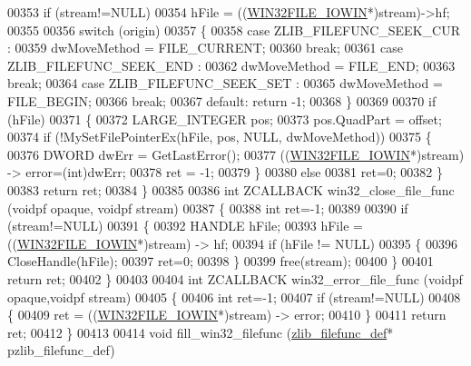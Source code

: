 \begin{DoxyCode}
00353     \textcolor{keywordflow}{if} (stream!=NULL)
00354         hFile = ((\hyperlink{struct_w_i_n32_f_i_l_e___i_o_w_i_n}{WIN32FILE\_IOWIN}*)stream)->hf;
00355 
00356     \textcolor{keywordflow}{switch} (origin)
00357     \{
00358         \textcolor{keywordflow}{case} ZLIB\_FILEFUNC\_SEEK\_CUR :
00359             dwMoveMethod = FILE\_CURRENT;
00360             \textcolor{keywordflow}{break};
00361         \textcolor{keywordflow}{case} ZLIB\_FILEFUNC\_SEEK\_END :
00362             dwMoveMethod = FILE\_END;
00363             \textcolor{keywordflow}{break};
00364         \textcolor{keywordflow}{case} ZLIB\_FILEFUNC\_SEEK\_SET :
00365             dwMoveMethod = FILE\_BEGIN;
00366             \textcolor{keywordflow}{break};
00367         \textcolor{keywordflow}{default}: \textcolor{keywordflow}{return} -1;
00368     \}
00369 
00370     \textcolor{keywordflow}{if} (hFile)
00371     \{
00372         LARGE\_INTEGER pos;
00373         pos.QuadPart = offset;
00374         \textcolor{keywordflow}{if} (!MySetFilePointerEx(hFile, pos, NULL, dwMoveMethod))
00375         \{
00376             DWORD dwErr = GetLastError();
00377             ((\hyperlink{struct_w_i_n32_f_i_l_e___i_o_w_i_n}{WIN32FILE\_IOWIN}*)stream) -> error=(int)dwErr;
00378             ret = -1;
00379         \}
00380         \textcolor{keywordflow}{else}
00381             ret=0;
00382     \}
00383     \textcolor{keywordflow}{return} ret;
00384 \}
00385 
00386 \textcolor{keywordtype}{int} ZCALLBACK win32\_close\_file\_func (voidpf opaque, voidpf stream)
00387 \{
00388     \textcolor{keywordtype}{int} ret=-1;
00389 
00390     \textcolor{keywordflow}{if} (stream!=NULL)
00391     \{
00392         HANDLE hFile;
00393         hFile = ((\hyperlink{struct_w_i_n32_f_i_l_e___i_o_w_i_n}{WIN32FILE\_IOWIN}*)stream) -> hf;
00394         \textcolor{keywordflow}{if} (hFile != NULL)
00395         \{
00396             CloseHandle(hFile);
00397             ret=0;
00398         \}
00399         free(stream);
00400     \}
00401     \textcolor{keywordflow}{return} ret;
00402 \}
00403 
00404 \textcolor{keywordtype}{int} ZCALLBACK win32\_error\_file\_func (voidpf opaque,voidpf stream)
00405 \{
00406     \textcolor{keywordtype}{int} ret=-1;
00407     \textcolor{keywordflow}{if} (stream!=NULL)
00408     \{
00409         ret = ((\hyperlink{struct_w_i_n32_f_i_l_e___i_o_w_i_n}{WIN32FILE\_IOWIN}*)stream) -> error;
00410     \}
00411     \textcolor{keywordflow}{return} ret;
00412 \}
00413 
00414 \textcolor{keywordtype}{void} fill\_win32\_filefunc (\hyperlink{structzlib__filefunc__def__s}{zlib\_filefunc\_def}* pzlib\_filefunc\_def)

\end{DoxyCode}
